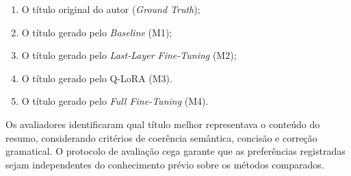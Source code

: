 \begin{enumerate}
    \item O título original do autor (\textit{Ground Truth});
    \item O título gerado pelo \textit{Baseline} (M1);
    \item O título gerado pelo \textit{Last-Layer Fine-Tuning} (M2);
    \item O título gerado pelo Q-LoRA (M3).
    \item O título gerado pelo \textit{Full Fine-Tuning} (M4).
\end{enumerate}

Os avaliadores identificaram qual título melhor representava o conteúdo do resumo, considerando critérios de coerência semântica, concisão e correção gramatical. O protocolo de avaliação cega garante que as preferências registradas sejam independentes do conhecimento prévio sobre os métodos comparados.
